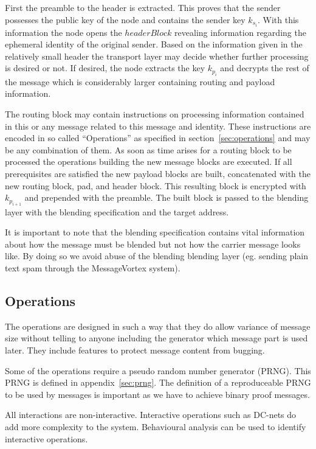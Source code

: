 \documentclass[9pt,journal,compsoc]{IEEEtran}
\begin{document}
First the preamble to the header is extracted. This proves that the sender possesses the public key of the node and contains the sender key $k_{s_i}$. With this information the node opens the $headerBlock$ revealing information regarding the ephemeral identity of the original sender. Based on the information given in the relatively small header the transport layer may decide whether further processing is desired or not. If desired, the node extracts the key $k_{p_i}$ and decrypts the rest of the message which is considerably larger containing routing and payload information.

The routing block may contain instructions on processing information contained in this or any message related to this message and identity. These instructions are encoded in so called ``Operations'' as specified in section~\ref{sec:operations} and may be any combination of them. As soon as time arises for a routing block to be processed the operations building the new message blocks are executed. If all prerequisites are satisfied the new payload blocks are built, concatenated with the new routing block, pad, and header block. This resulting block is encrypted with $k_{p_{i+1}}$ and prepended with the preamble. The built block is passed to the blending layer with the blending specification and the target address.

It is important to note that the blending specification contains vital information about how the message must be blended but not how the carrier message looks like. By doing so we avoid abuse of the blending blending layer (eg. sending plain text spam through the MessageVortex system).

\subsection{Operations\label{sec:operations}}
The operations are designed in such a way that they do allow  variance of message size without telling to anyone including the generator which message part is used later. They include features to protect message content from bugging.

Some of the operations require a pseudo random number generator (PRNG). This PRNG is defined in appendix~\ref{sec:prng}. The definition of a reproduceable PRNG to be used by messages is important as we have to achieve binary proof messages.

All interactions are non-interactive. Interactive operations such as DC-nets do add more complexity to the system. Behavioural analysis can be used to identify interactive operations. 
\end{document}
